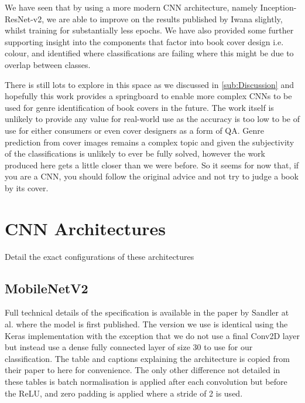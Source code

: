 \documentclass[12pt]{article}
\numberwithin{equation}{section}
\numberwithin{figure}{section}
\begin{document}
We have seen that by using a more modern CNN architecture, namely Inception-ResNet-v2, we are able to improve on the results published by Iwana slightly, whilst training for substantially less epochs. We have also provided some further supporting insight into the components that factor into book cover design i.e. colour, and identified where classifications are failing where this might be due to overlap between classes.

There is still lots to explore in this space as we discussed in \cref{sub:Discussion} and hopefully this work provides a springboard to enable more complex CNNs to be used for genre identification of book covers in the future. The work itself is unlikely to provide any value for real-world use as the accuracy is too low to be of use for either consumers or even cover designers as a form of QA. Genre prediction from cover images remains a complex topic and given the subjectivity of the classifications is unlikely to ever be fully solved, however the work produced here gets a little closer than we were before. So it seems for now that, if you are a CNN, you should follow the original advice and not try to judge a book by its cover.


 

\appendix

\section{CNN Architectures} 
\label{sec:CNN_Architectures} 
Detail the exact configurations of these architectures
\subsection{MobileNetV2} 
\label{sub:MobileNetV2} 
Full technical details of the specification is available in the paper by Sandler at al. \cite{Sandler2018} where the model is first published. The version we use is identical using the Keras implementation with the exception that we do not use a final Conv2D layer but instead use a dense fully connected layer of size 30 to use for our classification. The table and captions explaining the architecture is copied from their paper to here for convenience. The only other difference not detailed in these tables is batch normalisation is applied after each convolution but before the ReLU, and zero padding is applied where a stride of 2 is used. 
\end{document}
